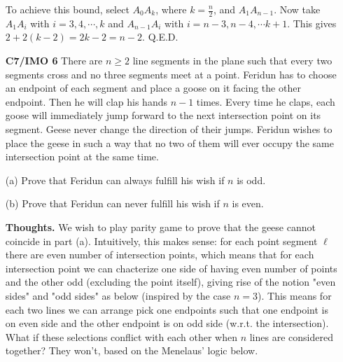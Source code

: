 \documentclass[11pt,a4paper]{article}
\begin{document}
\begin{itemize}
To achieve this bound, select $A_0A_k$, where $k=\frac n2$, and $A_1A_{n-1}$. 
Now take $A_1A_i$ with $i=3, 4, \cdots , k$ and $A_{n-1}A_i$ with $i=n-3, n-4, \cdots k+1$. 
This gives $2+2(k-2)=2k-2=n-2$. Q.E.D.

\newcommand{\person}{Feridun }
\newcommand{\pronoun}{he }
\newcommand{\possesive}{his }
\newcommand{\animal}{goose }
\newcommand{\animals}{geese }
\newcommand{\Animal}{Goose }
\newcommand{\Animals}{Geese }
\newcommand{\move}{jump }
\newcommand{\moves}{jumps }

\newpage
\item[\textbf{C7/IMO 6}]
There are $n\ge 2$ line segments in the plane such that every two segments cross and no three segments meet at a point. \person  has to choose an endpoint of each segment and place a \animal on it facing the other endpoint. Then \pronoun will clap \possesive hands $n-1$ times. Every time \pronoun claps, each \animal will immediately \move forward to the next intersection point on its segment. \Animals never change the direction of their jumps. \person wishes to place the \animals in such a way that no two of them will ever occupy the same intersection point at the same time.

(a) Prove that \person can always fulfill \possesive wish if $n$ is odd.

(b) Prove that \person can never fulfill \possesive wish if $n$ is even.

\textbf{Thoughts.} 
We wish to play parity game to prove that the \animals cannot coincide in part (a). 
Intuitively, this makes sense: 
for each point segment $\ell$ there are even number of intersection points, 
which means that for each intersection point we can chacterize one side of having even number of points and the other odd 
(excluding the point itself), giving rise of the notion "even sides" and "odd sides" as below (inspired by the case $n=3$). 
This means for each two lines we can arrange pick one endpoints such that one endpoint is on even side and the other endpoint is on odd side (w.r.t. the intersection). 
What if these selections conflict with each other when $n$ lines are considered together? 
They won't, based on the Menelaus' logic below. 


\end{itemize}
\end{document}
